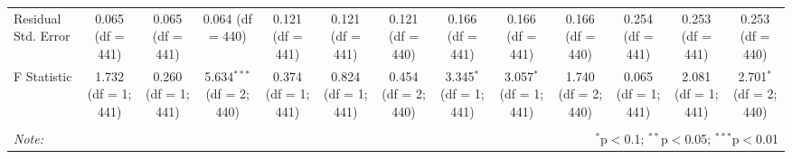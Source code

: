 \begin{table}[!htbp]
\begin{tabular}{@{\extracolsep{5pt}}lcccccccccccc}
Residual Std. Error & 0.065 (df = 441) & 0.065 (df = 441) & 0.064 (df = 440) & 0.121 (df = 441) & 0.121 (df = 441) & 0.121 (df = 440) & 0.166 (df = 441) & 0.166 (df = 441) & 0.166 (df = 440) & 0.254 (df = 441) & 0.253 (df = 441) & 0.253 (df = 440) \\ 
F Statistic & 1.732 (df = 1; 441) & 0.260 (df = 1; 441) & 5.634$^{***}$ (df = 2; 440) & 0.374 (df = 1; 441) & 0.824 (df = 1; 441) & 0.454 (df = 2; 440) & 3.345$^{*}$ (df = 1; 441) & 3.057$^{*}$ (df = 1; 441) & 1.740 (df = 2; 440) & 0.065 (df = 1; 441) & 2.081 (df = 1; 441) & 2.701$^{*}$ (df = 2; 440) \\ 
\hline 
\hline \\[-1.8ex] 
\textit{Note:}  & \multicolumn{12}{r}{$^{*}$p$<$0.1; $^{**}$p$<$0.05; $^{***}$p$<$0.01} \\ 
\end{tabular} 
\end{table} 
